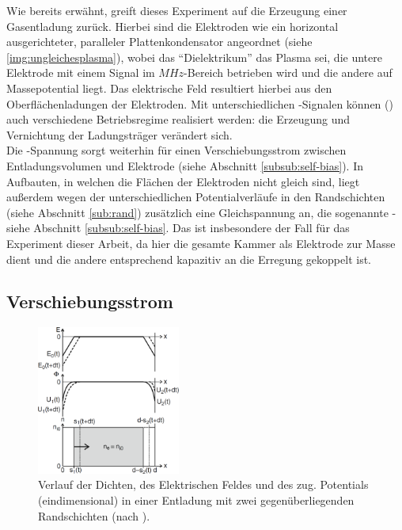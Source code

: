     Wie bereits erwähnt, greift dieses Experiment auf die Erzeugung einer Gasentladung zurück. Hierbei sind die Elektroden wie ein horizontal ausgerichteter, paralleler Plattenkondensator angeordnet (siehe \autoref{img:ungleichesplasma}), wobei das "`Dielektrikum"' das Plasma sei, die untere Elektrode mit einem Signal im $\unit{MHz}$-Bereich betrieben wird und die andere auf Massepotential liegt. Das elektrische Feld resultiert hierbei aus den Oberflächenladungen der Elektroden. Mit unterschiedlichen -Signalen können () auch verschiedene Betriebsregime realisiert werden: die Erzeugung und Vernichtung der Ladungsträger verändert sich.\\
    Die -Spannung sorgt weiterhin für einen Verschiebungsstrom zwischen Entladungsvolumen und Elektrode (siehe Abschnitt \ref{subsub:self-bias}). In Aufbauten, in welchen die Flächen der Elektroden nicht gleich sind, liegt außerdem wegen der unterschiedlichen Potentialverläufe in den Randschichten (siehe Abschnitt \ref{sub:rand}) zusätzlich eine Gleichspannung an, die sogenannte  - siehe Abschnitt \ref{subsub:self-bias}. Das ist insbesondere der Fall für das Experiment dieser Arbeit, da hier die gesamte Kammer als Elektrode zur Masse dient und die andere entsprechend kapazitiv an die Erregung gekoppelt ist.

      \subsection{Verschiebungsstrom} \label{subsub:verschieb}

        \begin{figure}
          \centering
          \includegraphics[width=0.42\textwidth,height=0.5\textwidth]{figs/verschiebpiel.png}
          \caption{Verlauf der Dichten, des Elektrischen Feldes und des zug. Potentials (eindimensional) in einer Entladung mit zwei gegenüberliegenden Randschichten (nach \cite{Piel10}).}
          \label{img:verschieb}
        \end{figure}

